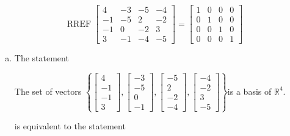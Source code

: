 \begin{exerciseAnswer} 


\[\operatorname{RREF} \left[\begin{array}{cccc}
4 & -3 & -5 & -4 \\
-1 & -5 & 2 & -2 \\
-1 & 0 & -2 & 3 \\
3 & -1 & -4 & -5
\end{array}\right] = \left[\begin{array}{cccc}
1 & 0 & 0 & 0 \\
0 & 1 & 0 & 0 \\
0 & 0 & 1 & 0 \\
0 & 0 & 0 & 1
\end{array}\right] \]


\begin{enumerate}[(a)]
\item The statement 
\begin{center}\begin{minipage}{0.8\textwidth}
 The set of vectors \( \left\{ \left[\begin{array}{c}
4 \\
-1 \\
-1 \\
3
\end{array}\right] , \left[\begin{array}{c}
-3 \\
-5 \\
0 \\
-1
\end{array}\right] , \left[\begin{array}{c}
-5 \\
2 \\
-2 \\
-4
\end{array}\right] , \left[\begin{array}{c}
-4 \\
-2 \\
3 \\
-5
\end{array}\right] \right\} \)is a basis of \(\mathbb{R}^4\). 
\end{minipage}\end{center}
     is equivalent to the statement 
\begin{center}\begin{minipage}{0.8\textwidth}
 The set of vectors \( \left\{ \left[\begin{array}{c}
4 \\
-1 \\

\end{array}
\end{minipage}
\end{center}
\end{enumerate}
\end{exerciseAnswer}
